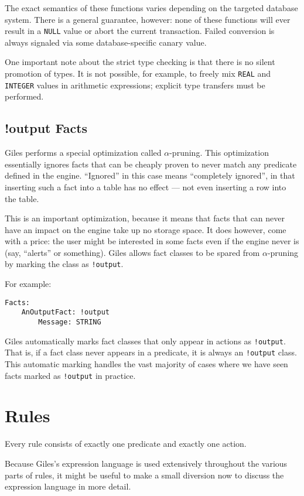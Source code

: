 \documentclass[letterpaper,10pt]{article}
\begin{document}
The exact semantics of these functions varies depending on the targeted database system.
There is a general guarantee, however: none of these functions will ever result in a \texttt{NULL} value or abort the current transaction.
Failed conversion is always signaled via some database-specific canary value.

One important note about the strict type checking is that there is no silent promotion of types.
It is not possible, for example, to freely mix \texttt{REAL} and \texttt{INTEGER} values in arithmetic expressions; explicit type transfers must be performed.

\subsection{!output Facts}
Giles performs a special optimization called $\alpha$-pruning.
This optimization essentially ignores facts that can be cheaply proven to never match any predicate defined in the engine.
``Ignored'' in this case means ``completely ignored'', in that inserting such a fact into a table has no effect --- not even inserting a row into the table.

This is an important optimization, because it means that facts that can never have an impact on the engine take up no storage space.
It does however, come with a price: the user might be interested in some facts even if the engine never is (say, ``alerts'' or something).
Giles allows fact classes to be spared from $\alpha$-pruning by marking the class as \texttt{!output}.

For example:
\begin{lstlisting}
Facts:
    AnOutputFact: !output
        Message: STRING
\end{lstlisting}

Giles automatically marks fact classes that only appear in actions as \texttt{!output}.
That is, if a fact class never appears in a predicate, it is always an \texttt{!output} class.
This automatic marking handles the vast majority of cases where we have seen facts marked as \texttt{!output} in practice.

\section{Rules}
Every rule consists of exactly one predicate and exactly one action.

Because Giles's expression language is used extensively throughout the various parts of rules, it might be useful to make a small diversion now to discuss the expression language in more detail.
\end{document}
